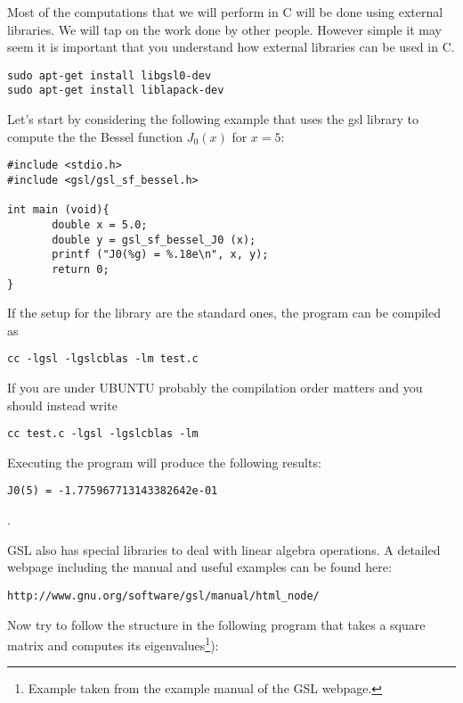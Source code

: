 \documentclass{article}
\begin{document}
Most of the computations that we will perform in C will be done using
external libraries. We will tap on the work done by other
people. However simple it may seem it is important that you understand
how external libraries can be used in C.  

\begin{verbatim}
sudo apt-get install libgsl0-dev
sudo apt-get install liblapack-dev
\end{verbatim}

Let's start by considering the following example that uses the gsl library to compute the the Bessel function $J_{0}(x)$ for $x=5$:

\begin{verbatim}
#include <stdio.h>
#include <gsl/gsl_sf_bessel.h>
     
int main (void){
       double x = 5.0;
       double y = gsl_sf_bessel_J0 (x);
       printf ("J0(%g) = %.18e\n", x, y);
       return 0;
}
\end{verbatim}

If the setup for the library are the standard ones, the program can be compiled as

\begin{verbatim}
cc -lgsl -lgslcblas -lm test.c 
\end{verbatim}



If you are under UBUNTU probably the compilation order matters and you should instead write

\begin{verbatim}
cc test.c -lgsl -lgslcblas -lm 
\end{verbatim}

Executing the program will produce the following results:

\begin{verbatim}
J0(5) = -1.775967713143382642e-01
\end{verbatim}.


GSL also has special libraries to deal with linear algebra operations. A detailed webpage including the manual and useful examples can be found here:

\begin{verbatim}
http://www.gnu.org/software/gsl/manual/html_node/
\end{verbatim}

Now try to follow the structure in the following program that takes a square matrix and computes its eigenvalues\footnote{Example taken from the example manual of the GSL webpage.}):
\end{document}
